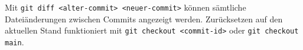 Mit \lstinline|git diff <alter-commit> <neuer-commit>| können sämtliche Dateiänderungen zwischen Commits angezeigt werden. Zurücksetzen auf den aktuellen Stand funktioniert mit \lstinline|git checkout <commit-id>| oder \lstinline|git checkout main|.
